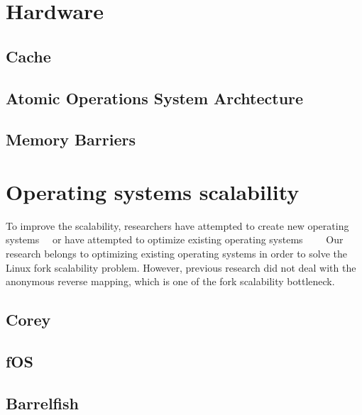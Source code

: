 
\section{Hardware}
\label{sec:hwrelated}

\subsection{Cache}


\subsection{Atomic Operations System Archtecture}


\subsection{Memory Barriers}


\section{Operating systems scalability}
\label{sec:osrelated}
To improve the scalability, researchers have attempted to create new
operating systems~\cite{Boyd-WickizerCorey}~\cite{Wentzlaff2010fOS}
or have
attempted to optimize existing operating systems~\cite{SilasBoydWickizer2010LinuxScales48}~\cite{AustinTClements2012RCUBalancedTrees}~\cite{Clements2013RadixVM}~\cite{SilasBoydWickizerPth}
Our research belongs to optimizing existing operating systems in order to
solve the Linux fork scalability problem.
However, previous research did not deal with the anonymous reverse mapping,
which is one of the fork scalability bottleneck.

\subsection{Corey}
\subsection{fOS}
\subsection{Barrelfish}
